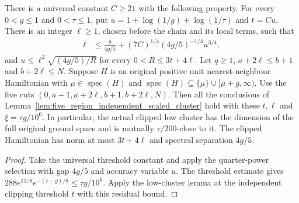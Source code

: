 \begin{lemma}
    \label{thm:independent_physical_dg_cluster_parameters}
    \leanok
    There is a universal constant $C\ge21$ with the following property.
    For every $0<g\le1$ and $0<\tau\le1$, put
    $u=1+\log(1/g)+\log(1/\tau)$ and $t=Cu$.
    There is an integer $\ell\ge1$, chosen before the chain and its local
    terms, such that
    \begin{align}
        \ell & \le\frac{8}{4g/5}
        +(7C)^{1/4}(4g/5)^{-1/4}u^{3/4},
        \label{eq:independent_physical_window}
    \end{align}
    and $u\le\ell^2\sqrt{(4g/5)/R}$ for every $0<R\le3t+4\ell$.
    Let $q\ge1$, $a+2\ell\le b+1$ and $b+2\ell\le N$.
    Suppose $H$ is an original positive unit nearest-neighbour Hamiltonian
    with $\mu\in\operatorname{spec}(H)$ and
    $\operatorname{spec}(H)\subseteq\{\mu\}\cup[\mu+g,\infty)$.
    Use the five cuts $(0,a+1,a+2\ell,b+1,b+2\ell,N)$.
    Then all the conclusions of
    Lemma~\ref{lem:five_region_independent_scaled_cluster} hold with these $t,\ell$
    and $\xi=\tau g/10^6$.
    In particular, the actual clipped low cluster has the dimension of the
    full original ground space and is mutually $\tau/200$-close to it.
    The clipped Hamiltonian has norm at most $3t+4\ell$ and spectral
    separation $4g/5$.
\end{lemma}
\begin{proof}
    \leanok
    Take the universal threshold constant and apply the quarter-power
    selection with gap $4g/5$ and accuracy variable $u$.
    The threshold estimate gives
    $288e^{11/8}e^{-(t-g)/8}\le\tau g/10^6$.
    Apply the low-cluster lemma at the independent clipping threshold $t$
    with this residual bound.
\end{proof}
